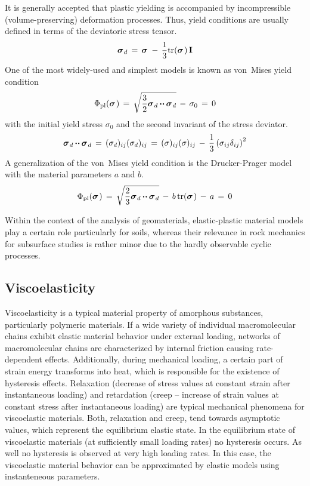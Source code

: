 It is generally accepted that plastic yielding is accompanied by incompressible (volume-preserving) deformation processes. Thus, yield
conditions are usually defined in terms of the deviatoric stress tensor.
\begin{equation}
\miu{\sigma}{d}{}\,=\,\miu{\sigma}{}{}\,-\,\frac{1}{3}\mathrm{tr}(\miu{\sigma}{}{})\,\mathbf{I}
\label{eq:devstress}
\end{equation}
One of the most widely-used and simplest models is known as von~Mises yield condition
\begin{equation}
\Phi_{\mathrm{pl}}(\miu{\sigma}{}{})\,=\,
\sqrt{\ttfrac{3}{2}\miu{\sigma}{d}{}\ccdot\miu{\sigma}{d}{}}\,-\,\sigma_0\,=\,0
\label{eq:mises}
\end{equation}
with the initial yield stress $\sigma_0$ and the second invariant of the stress deviator.
\begin{equation}
\mbox{${\mbox{\boldmath${\sigma}$\unboldmath}}_{\:\!d}$}\mbox{\,${\mbox{\boldmath$\cdot\cdot$\unboldmath}}$\,}\mbox{${\mbox{\boldmath${\sigma}$\unboldmath}}_{\:\!d}$}\,=\,
(\sigma_d){}_{ij}(\sigma_d){}_{ij}\,=\,(\sigma){}_{ij}(\sigma){}_{ij}\,-\,
\frac{1}{3}\left(\sigma_{ij}\delta_{ij}\right)^2
\end{equation}
A generalization of the von~Mises yield condition is the Drucker-Prager model
with the material parameters $a$ and $b$.
\begin{equation}
\Phi_{\mathrm{pl}}(\miu{\sigma}{}{})\,=\,
\sqrt{\ttfrac{2}{3}\miu{\sigma}{d}{}\ccdot\miu{\sigma}{d}{}}\,-\,b\,\mathrm{tr}(\miu{\sigma}{}{})\,-\,a\,=\,0
\label{eq:drucker_prager}
\end{equation}

Within the context of the analysis of geomaterials, elastic-plastic material models play a certain role particularly for soils, whereas
their relevance in rock mechanics for subsurface studies is rather minor due to the hardly observable cyclic processes.

\subsection{Viscoelasticity}
\label{sec:viscoelast}

Viscoelasticity is a typical material property of amorphous substances, particularly polymeric materials. If a wide variety of individual
macromolecular chains exhibit elastic material behavior under external loading, networks of macromolecular chains are characterized by
internal friction causing rate-dependent effects. Additionally, during mechanical loading, a certain part of strain energy transforms into
heat, which is responsible for the existence of hysteresis effects. Relaxation (decrease of stress values at constant strain after
instantaneous loading) and retardation (creep -- increase of strain values at constant stress after instantaneous loading) are typical
mechanical phenomena for viscoelastic materials. Both, relaxation and creep, tend towards asymptotic values, which represent the
equilibrium elastic state. In the equilibrium state of viscoelastic materials (at sufficiently small loading rates) no hysteresis occurs.
As well no hysteresis is observed at very high loading rates. In this case, the viscoelastic material behavior can be approximated by
elastic models using instanteneous parameters.


